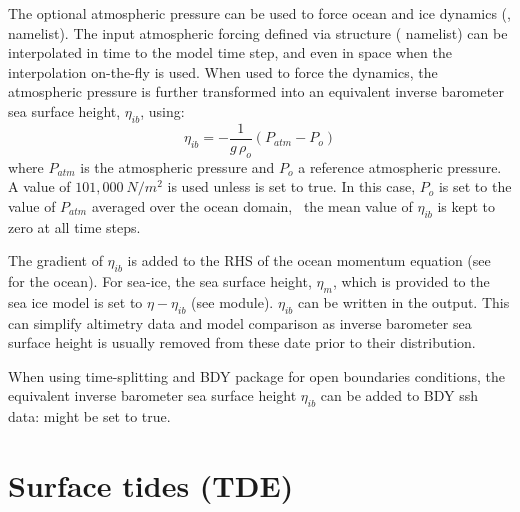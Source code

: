 \documentclass[../main/NEMO_manual]{subfiles}
\begin{document}
The optional atmospheric pressure can be used to force ocean and ice dynamics
(,  namelist).
The input atmospheric forcing defined via  structure ( namelist)
can be interpolated in time to the model time step, and even in space when the interpolation on-the-fly is used.
When used to force the dynamics, the atmospheric pressure is further transformed into
an equivalent inverse barometer sea surface height, $\eta_{ib}$, using:
\[
  \eta_{ib} = -  \frac{1}{g\,\rho_o}  \left( P_{atm} - P_o \right)
\]
where $P_{atm}$ is the atmospheric pressure and $P_o$ a reference atmospheric pressure.
A value of $101,000~N/m^2$ is used unless  is set to true.
In this case, $P_o$ is set to the value of $P_{atm}$ averaged over the ocean domain,
\ie\ the mean value of $\eta_{ib}$ is kept to zero at all time steps.

The gradient of $\eta_{ib}$ is added to the RHS of the ocean momentum equation (see  for the ocean).
For sea-ice, the sea surface height, $\eta_m$, which is provided to the sea ice model is set to $\eta - \eta_{ib}$
(see  module).
$\eta_{ib}$ can be written in the output.
This can simplify altimetry data and model comparison as
inverse barometer sea surface height is usually removed from these date prior to their distribution.

When using time-splitting and BDY package for open boundaries conditions,
the equivalent inverse barometer sea surface height $\eta_{ib}$ can be added to BDY ssh data:
  might be set to true.

\section{Surface tides (TDE)}
\label{sec:SBC_TDE}

\begin{listing}
  \caption{}
  \label{lst:nam_tide}
\end{listing}
\end{document}
